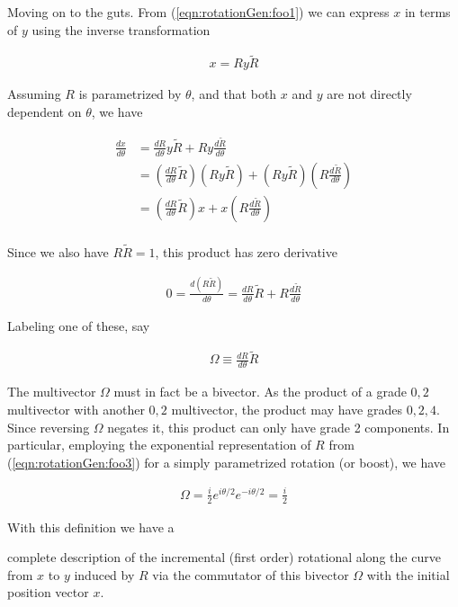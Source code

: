 Moving on to the guts.  From (\ref{eqn:rotationGen:foo1}) we can express $x$ in terms of $y$ using the inverse transformation

\begin{align}\label{eqn:rotationGen:foo10}
x = R y \tilde{R} 
\end{align}

Assuming $R$ is parametrized by $\theta$, and that both $x$ and $y$ are not directly dependent on $\theta$, we have

\begin{align*}
\frac{dx}{d\theta} 
&= 
\frac{d R}{d \theta} y \tilde{R} + R y \frac{d \tilde{R} }{d\theta} \\
&= 
\left(\frac{d R}{d \theta} \tilde{R} \right) (R y \tilde{R}) + (R y \tilde{R}) \left( R \frac{d \tilde{R} }{d\theta} \right) \\
&= 
\left(\frac{d R}{d \theta} \tilde{R} \right) x + x \left( R \frac{d \tilde{R} }{d\theta} \right) \\
\end{align*}

Since we also have $R \tilde{R} = 1$, this product has zero derivative

\begin{align*}
0 = \frac{d (R \tilde{R})}{d\theta} = \frac{d R}{d\theta} \tilde{R} + R \frac{d \tilde{R}}{d\theta} 
\end{align*}

Labeling one of these, say

\begin{align}\label{eqn:rotationGen:foo11}
\Omega \equiv \frac{d R}{d\theta} \tilde{R} 
\end{align}

The multivector $\Omega$ must in fact be a bivector.  As the product of a grade $0,2$ multivector with another $0,2$ multivector, the product may have grades $0,2,4$.  Since reversing $\Omega$ negates it, this product can only have grade 2 components.  In particular, employing the exponential representation of $R$ from (\ref{eqn:rotationGen:foo3}) for a simply parametrized rotation (or boost), we have

\begin{align}\label{eqn:rotationGen:foo16}
\Omega = \frac{i}{2} e^{i \theta/2} e^{-i \theta/2} = \frac{i}{2}
\end{align}

With this definition we have a 

complete description of the incremental (first order) rotational along the curve from $x$ to $y$ induced by $R$ via the commutator of this bivector $\Omega$ with the initial position vector $x$.

